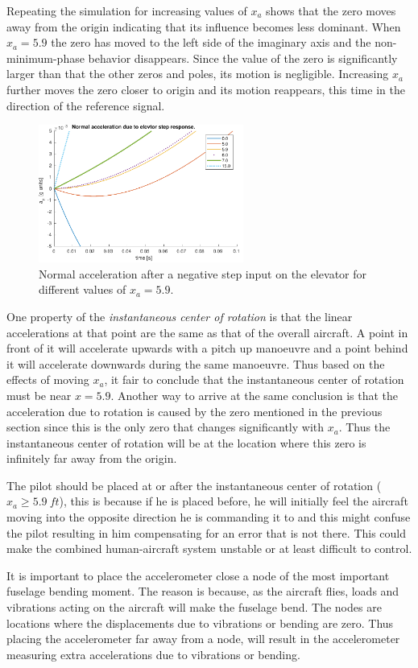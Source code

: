 Repeating the simulation for increasing values of $x_a$ shows that the zero moves away from the origin indicating that its influence becomes less dominant. When $x_a=5.9$ the zero has moved to the left side of the imaginary axis and the non-minimum-phase behavior disappears. Since the value of the zero is significantly larger than that the other zeros and poles, its motion is negligible. Increasing $x_a$ further moves the zero closer to origin and its motion reappears, this time in the direction of the reference signal.

\begin{figure}[ht]
    \centering
    \includegraphics[width=0.6\textwidth]{figures/an_elev_step_mult}
    \caption{Normal acceleration after a negative step input on the elevator for different values of $x_a=5.9$.}
    \label{fig:an_elev_step_mult}
\end{figure}

One property of the \emph{instantaneous center of rotation} is that the linear accelerations at that point are the same as that of the overall aircraft. A point in front of it will accelerate upwards with a pitch up manoeuvre and a point behind it will accelerate downwards during the same manoeuvre. Thus based on the effects of moving $x_a$, it fair to conclude that the instantaneous center of rotation must be near $x=5.9$. Another way to arrive at the same conclusion is that the acceleration due to rotation is caused by the zero mentioned in the previous section since this is the only zero that changes significantly with $x_a$. Thus the instantaneous center of rotation will be at the location where this zero is infinitely far away from the origin.

The pilot should be placed at or after the instantaneous center of rotation ($x_a\geq5.9\ ft$), this is because if he is placed before, he will initially feel the aircraft moving into the opposite direction he is commanding it to and this might confuse the pilot resulting in him compensating for an error that is not there. This could make the combined human-aircraft system unstable or at least difficult to control.

It is important to place the accelerometer close a node of the most important fuselage bending moment. The reason is because, as the aircraft flies, loads and vibrations acting on the aircraft will make the fuselage bend. The nodes are locations where the displacements due to vibrations or bending are zero. Thus placing the accelerometer far away from a node, will result in the accelerometer measuring extra accelerations due to vibrations or bending. 


\clearpage
